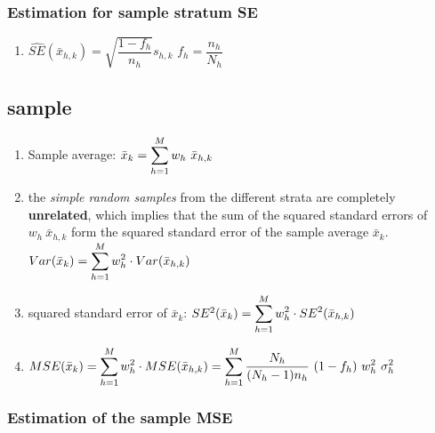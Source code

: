 \subsubsection{Estimation for sample stratum SE}
\begin{enumerate}
    \item $
        \hat{SE}(\bar{x}_{h,k})
        = \sqrt{\dfrac{1 - f_h}{n_h}} s_{h,k}
    $
    \hfill
    $f_h = \dfrac{n_h}{N_h}$
    \hfill \cite{statistics/book/Statistics-for-Data-Scientists/Maurits-Kaptein}
\end{enumerate}



\subsection{sample}
\begin{enumerate}
    \item Sample average: $
        \bar{x}_k = \displaystyle\sum^M_{h=1} w_h\ \bar{x}_{h,k}
    $
    \hfill \cite{statistics/book/Statistics-for-Data-Scientists/Maurits-Kaptein}

    \item the \textit{simple random samples} from the different strata are completely \textbf{unrelated}, which implies that the sum of the squared standard errors of $w_h \ \bar{x}_{h,k}$ form the squared standard error of the sample average $\bar{x}_k$.
    \hfill \cite{statistics/book/Statistics-for-Data-Scientists/Maurits-Kaptein}
    \\
    $
        Var(\bar{x}_k) = \displaystyle\sum_{h=1}^M w_h^2 \cdot Var(\bar{x}_{h,k})
    $
    \hfill \cite{common/online/chatgpt}
    
    
    \item squared standard error of $\bar{x}_k$: 
    $
        SE^2(\bar{x}_k) = \displaystyle\sum_{h=1}^M w_h^2 \cdot SE^2(\bar{x}_{h,k})
    $
    \hfill \cite{common/online/chatgpt}

    \item $
        MSE(\bar{x}_k ) 
        = \dsum^M_{h=1} w^2_h \cdot MSE(\bar{x}_{h,k} ) 
        = \dsum^M_{h=1} \dfrac{N_h}{(N_h - 1)n_h} \ (1 - f_h)\ w^2_h\ \sigma^2_h$
    \hfill \cite{statistics/book/Statistics-for-Data-Scientists/Maurits-Kaptein}

\end{enumerate}


\subsubsection{Estimation of the sample MSE}

